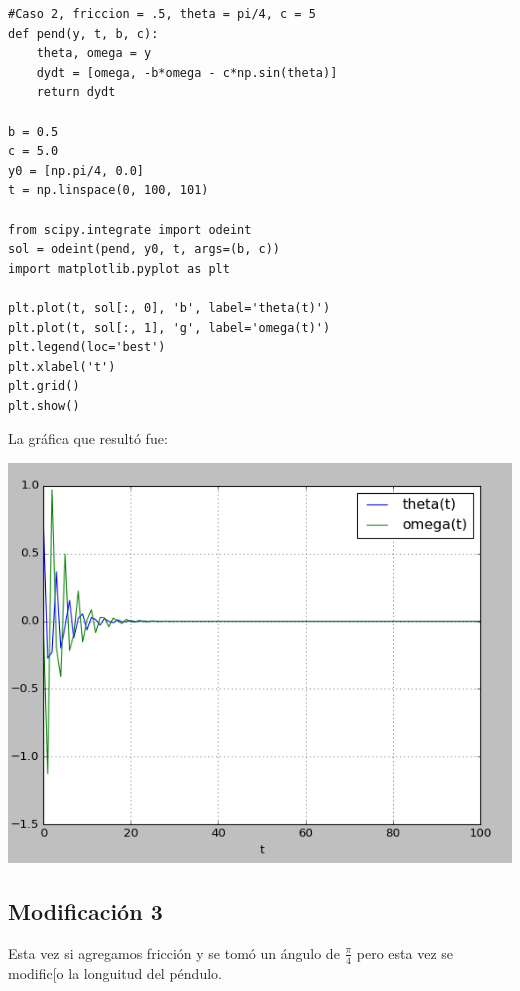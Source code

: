 \documentclass[12pt,letterpaper]{article}
\begin{document}
\begin{verbatim}
#Caso 2, friccion = .5, theta = pi/4, c = 5
def pend(y, t, b, c):
    theta, omega = y
    dydt = [omega, -b*omega - c*np.sin(theta)]
    return dydt
    
b = 0.5
c = 5.0
y0 = [np.pi/4, 0.0]
t = np.linspace(0, 100, 101)
    
from scipy.integrate import odeint
sol = odeint(pend, y0, t, args=(b, c))
import matplotlib.pyplot as plt
   
plt.plot(t, sol[:, 0], 'b', label='theta(t)')
plt.plot(t, sol[:, 1], 'g', label='omega(t)')
plt.legend(loc='best')
plt.xlabel('t')
plt.grid()
plt.show()
\end{verbatim}
La gráfica que resultó fue:
\begin{center}
\includegraphics[scale=0.6]{act5caso2.png}
\end{center}

\newpage

\subsection*{Modificación 3}
Esta vez si agregamos fricción y se tomó un ángulo de $\frac{\pi}{4}$ pero esta vez se modific[o la longuitud del péndulo.
\end{document}
